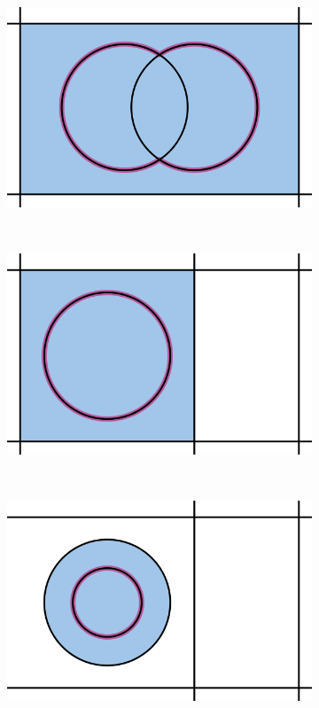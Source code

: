 \begin{figure}%
  \centering
  \begin{subfigure}{.32\textwidth}
    \includegraphics[width=\textwidth]{figures/subd_restrictedFail_a.png}
  \end{subfigure}%
  ~%
  \begin{subfigure}{.32\textwidth}
    \includegraphics[width=\textwidth]{figures/subd_restrictedFail_b.png}
  \end{subfigure}%
  ~%
  \begin{subfigure}{.32\textwidth}
    \includegraphics[width=\textwidth]{figures/subd_restrictedFail_c.png}

\end{subfigure}
\end{figure}
